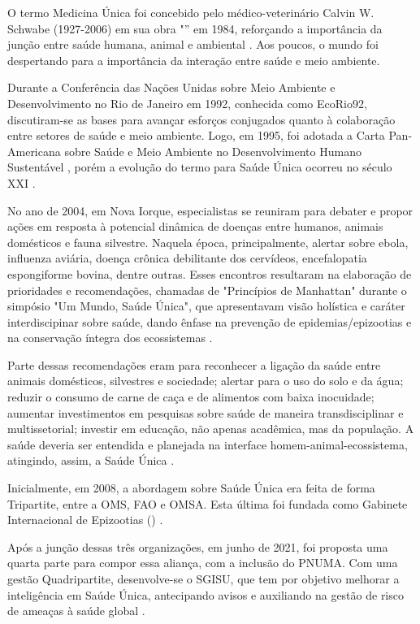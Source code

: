 \indent O termo Medicina Única foi concebido pelo médico-veterinário Calvin W. Schwabe (1927-2006) em sua obra "” em 1984, reforçando a importância da junção entre saúde humana, animal e ambiental \cite{CFMVSaude}. Aos poucos, o mundo foi despertando para a importância da interação entre saúde e meio ambiente.

\indent Durante a Conferência das Nações Unidas sobre Meio Ambiente e Desenvolvimento no Rio de Janeiro em 1992, conhecida como EcoRio92, discutiram-se as bases para avançar esforços conjugados quanto à colaboração entre setores de saúde e meio ambiente. Logo, em 1995, foi adotada a Carta Pan-Americana sobre Saúde e Meio Ambiente no Desenvolvimento Humano Sustentável \cite{S1_OPAS_OMS}, porém a evolução do termo para Saúde Única ocorreu no século XXI \cite{CFMVSaude}. 

\indent No ano de 2004, em Nova Iorque, especialistas se reuniram para debater e propor ações em resposta à potencial dinâmica de doenças entre humanos, animais domésticos e fauna silvestre. Naquela época, principalmente, alertar sobre ebola, influenza aviária, doença crônica debilitante dos cervídeos, encefalopatia espongiforme bovina, dentre outras. Esses encontros resultaram na elaboração de prioridades e recomendações, chamadas de "Princípios de Manhattan" durante o simpósio "Um Mundo, Saúde Única", que apresentavam visão holística e caráter interdiscipinar sobre saúde, dando ênfase na prevenção de epidemias/epizootias e na conservação íntegra dos ecossistemas \cite{ManhattanPrinciples2004}.

\indent Parte dessas recomendações eram para reconhecer a ligação da saúde entre animais domésticos, silvestres e sociedade; alertar para o uso do solo e da água; reduzir o consumo de carne de caça e de alimentos com baixa inocuidade; aumentar investimentos em pesquisas sobre saúde de maneira transdisciplinar e multissetorial; investir em educação, não apenas acadêmica, mas da população. A saúde deveria ser entendida e planejada na interface homem-animal-ecossistema, atingindo, assim, a Saúde Única \cite{ManhattanPrinciples2004}.

\indent Inicialmente, em 2008, a abordagem sobre Saúde Única era feita de forma Tripartite, entre a \acrfull{OMS}, \acrfull{FAO} e \acrfull{OMSA}. Esta última foi fundada como Gabinete Internacional de Epizootias () \cite{S1Quadripartite}.

\indent Após a junção dessas três organizações, em junho de 2021, foi proposta uma quarta parte para compor essa aliança, com a inclusão do \acrfull{PNUMA}. Com uma gestão Quadripartite, desenvolve-se o \acrfull{SGISU}, que tem por objetivo melhorar a inteligência em Saúde Única, antecipando avisos e auxiliando na gestão de risco de ameaças à saúde global \cite{S1Quadripartite}.

